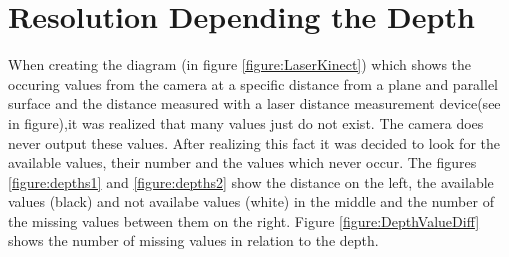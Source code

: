 \section{Resolution Depending the Depth} \label{resdepDepth}
When creating the diagram (in figure \vref{figure:LaserKinect}) which shows the occuring values from the camera 
at a specific distance from a plane and parallel surface and the distance measured with a laser distance measurement 
device(see in figure),it was realized that many values just do not exist. The camera does never output these values.
After realizing this fact it was decided to look for the available values, their number and the values which never occur.
The figures \vref{figure:depths1} and \vref{figure:depths2} show the distance on the left, the available values (black) and 
not availabe values (white) in the middle and the number of the missing values between them on the right. 
Figure \vref{figure:DepthValueDiff} shows the number of missing values in relation to the depth.

